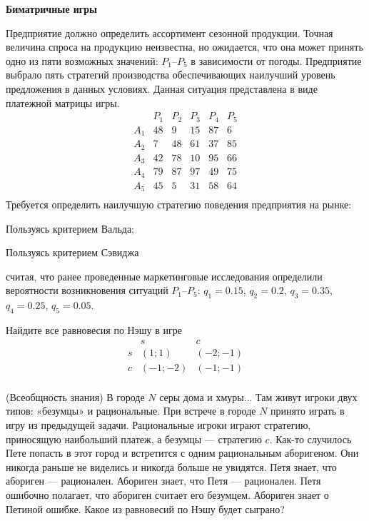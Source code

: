 \documentclass[a4paper,14pt]{extarticle}
\begin{document}
\begin{enumerate}
  {\item[]
          \bfseries Биматричные игры
          \par\vspace{1mm}
  }

\item 
Предприятие должно определить ассортимент сезонной продукции. Точная величина спроса на продукцию неизвестна, но ожидается, что она может принять одно из пяти возможных значений:  $P_1$--$P_5$ в зависимости от погоды. Предприятие выбрало пять стратегий производства обеспечивающих  наилучший уровень предложения в данных условиях. Данная ситуация представлена в виде платежной матрицы игры.
$$
\begin{array}{c|ccccc}
    & P_1 & P_2 &P_3 &P_4 &P_5 \\
\hline
A_1 & 48  & 9   & 15 & 87 & 6  \\     
A_2 & 7   & 48  & 61 & 37 & 85 \\    
A_3 & 42  & 78  & 10 & 95 & 66 \\     
A_4 & 79  & 87  & 97 & 49 & 75 \\     
A_5 & 45  & 5   & 31 & 58 & 64 \\   
\end{array}
$$
Требуется определить наилучшую стратегию поведения предприятия на рынке:
\begin{enumerate*}
    \item Пользуясь критерием Вальда;
    \item Пользуясь критерием Сэвиджа
    \item считая, что ранее проведенные маркетинговые исследования  определили вероятности возникновения ситуаций  $P_1$--$P_5$: $q_1 =0.15$, $q_2 =0.2$, $q_3 =0.35$, $q_4 =0.25$, $q_5 =0.05$.
\end{enumerate*}


\item Найдите все равновесия по Нэшу в игре
$$
\begin{array}{c|cc}
     & s & c \\
     \hline
    s & (1; 1) & (-2; -1) \\
    c & (-1; -2) & (-1; -1) \\
\end{array}
$$

\item (Всеобщность знания) В городе $N$ серы дома и хмуры... Там  живут игроки двух типов: «безумцы» и рациональные. При встрече в городе $N$ принято играть в игру из предыдущей задачи.
Рациональные игроки играют стратегию, приносящую наибольший платеж, а безумцы --- стратегию $c$.
Как-то случилось Пете попасть в этот город и встретится с одним рациональным аборигеном. Они никогда раньше не виделись и никогда больше не увидятся. Петя знает, что абориген --- рационален.
Абориген знает, что Петя --- рационален. Петя ошибочно полагает, что абориген считает его безумцем. Абориген знает о Петиной ошибке.
Какое из равновесий по Нэшу будет сыграно?


\end{enumerate}
\end{document}
